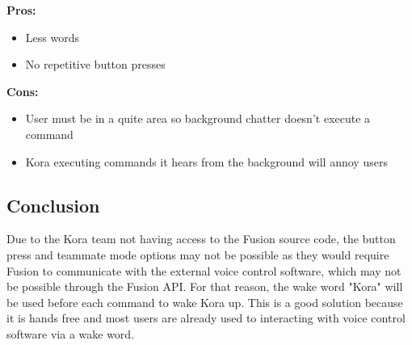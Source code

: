 \documentclass[onecolumn, draftclsnofoot,10pt, compsoc]{IEEEtran}
\begin{document}
			\textbf{Pros:}
				\begin{itemize}
					\item{
						Less words}
					\item{
						No repetitive button presses}
				\end{itemize}
			
			\textbf{Cons:}
				\begin{itemize}
					\item{
						User must be in a quite area so background chatter doesn't execute a command}
					\item{
						Kora executing commands it hears from the background will annoy users}
				\end{itemize}
			
			
		\subsection{Conclusion}
			Due to the Kora team not having access to the Fusion source code, the button press and teammate mode options may not be possible as they would require Fusion to communicate with the external voice control software, which may not be possible through the Fusion API.
			For that reason, the wake word "Kora" will be used before each command to wake Kora up.
			This is a good solution because it is hands free and most users are already used to interacting with voice control software via a wake word.
		
		
	
	
\end{document}
